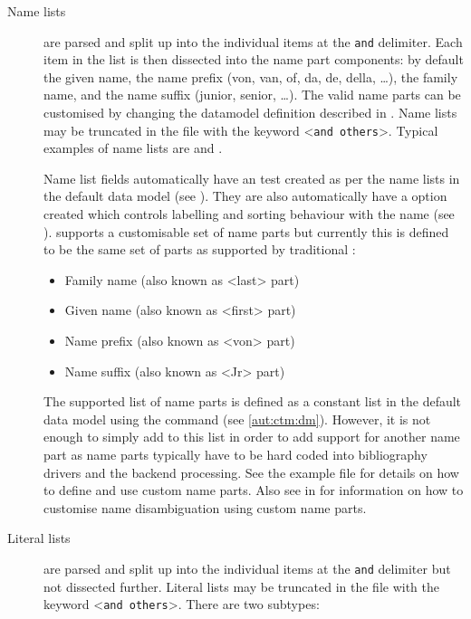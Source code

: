 \documentclass{ltxdockit}[2011/03/25]
\newcommand*{\biber}{\sty{biber}\xspace}
\begin{document}
\begin{description}

\item[Name lists] are parsed and split up into the individual items at the \texttt{and} delimiter. Each item in the list is then dissected into the name part components: by default the given name, the name prefix (von, van, of, da, de, della, \dots), the family name, and the name suffix (junior, senior, \dots). The valid name parts can be customised by changing the datamodel definition described in . Name lists may be truncated in the  file with the keyword <\texttt{and others}>. Typical examples of name lists are  and .

Name list fields automatically have an  test created as per the name lists in the default data model (see ). They are also automatically have a  option created which controls labelling and sorting behaviour with the name (see ). \biber supports a customisable set of name parts but currently this is defined to be the same set of parts as supported by traditional \bibtex:

\begin{itemize}
\item Family name (also known as <last> part)
\item Given name (also known as <first> part)
\item Name prefix (also known as <von> part)
\item Name suffix (also known as <Jr> part)
\end{itemize}

The supported list of name parts is defined as a constant list in the default data model using the  command (see \ref{aut:ctm:dm}). However, it is not enough to simply add to this list in order to add support for another name part as name parts typically have to be hard coded into bibliography drivers and the backend processing. See the example file  for details on how to define and use custom name parts. Also see  in  for information on how to customise name disambiguation using custom name parts.

\item[Literal lists] are parsed and split up into the individual items at the \texttt{and} delimiter but not dissected further. Literal lists may be truncated in the  file with the keyword <\texttt{and others}>. There are two subtypes:


\end{description}
\end{document}
